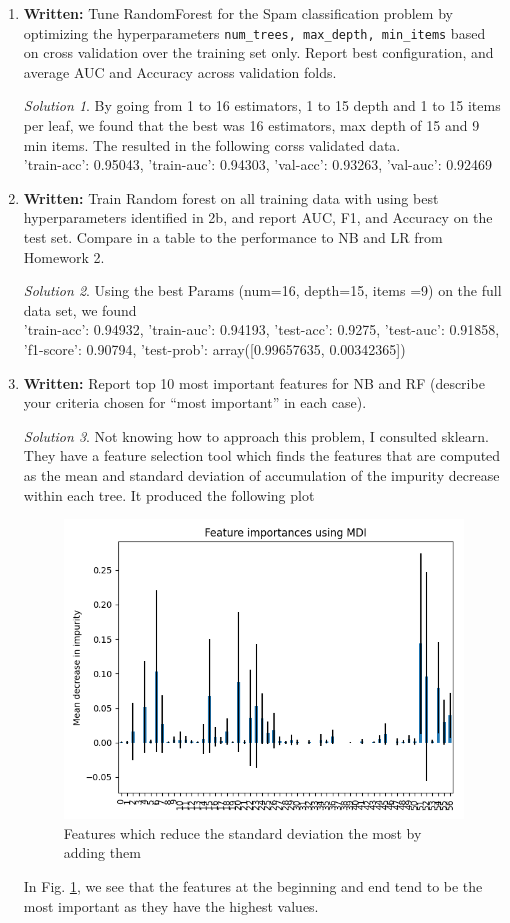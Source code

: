 \documentclass[a4paper,12pt]{article}
\theoremstyle{definition}
\theoremstyle{remark}
\newtheorem*{solution}{Solution}
\begin{document}
\begin{enumerate}
\begin{enumerate}
			\item  {\bf Written:} Tune RandomForest for the Spam classification problem by optimizing the hyperparameters
			{\tt num\_trees, max\_depth, min\_items} based on cross validation over the training set only. Report best configuration,
			and average AUC and Accuracy across validation folds.
			\begin{solution}
				By going from 1 to 16 estimators, 1 to 15 depth and 1 to 15 items per leaf, we found that the best was 16 estimators, max depth of 15 and 9 min items. The resulted in the following corss validated data.\\
				
				{'train-acc': 0.95043, 'train-auc': 0.94303, 'val-acc': 0.93263, 'val-auc': 0.92469}
			\end{solution}
			\item {\bf Written:} Train Random forest on all training data with using best hyperparameters identified in 2b, and report
			AUC, F1, and Accuracy on the test set. Compare in a table to the performance to NB and LR from Homework 2.
			\begin{solution}
				Using the best Params (num=16, depth=15, items =9) on the full data set, we found\\
				
				{'train-acc': 0.94932, 'train-auc': 0.94193, 'test-acc': 0.9275, 'test-auc': 0.91858, 'f1-score': 0.90794, 'test-prob': array([0.99657635, 0.00342365])}
			\end{solution}
			\item {\bf Written:} Report top 10 most important features for NB and RF (describe your criteria chosen for “most
			important” in each case).
			\begin{solution}
				Not knowing how to approach this problem, I consulted sklearn. They have a feature selection tool which finds the features that are computed as the mean and standard deviation of accumulation of the impurity decrease within each tree. It produced the following plot
				\begin{figure}
					\centering
					\includegraphics[width=0.7\linewidth]{../rfc_features}
					\caption{Features which reduce the standard deviation the most by adding them}
					\label{fig:rfcfeatures}
				\end{figure}
				In Fig. \ref{fig:rfcfeatures}, we see that the features at the beginning and end tend to be the most important as they have the highest values.
				

\end{solution}
\end{enumerate}
\end{enumerate}
\end{document}
